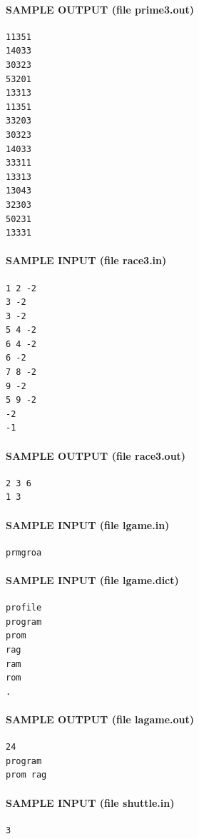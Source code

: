\documentclass[11pt]{article}
\begin{document}
\paragraph{SAMPLE OUTPUT (file prime3.out)}
\begin{verbatim}
11351
14033
30323
53201
13313
11351
33203
30323
14033
33311
13313
13043
32303
50231
13331
\end{verbatim}

\paragraph{SAMPLE INPUT (file race3.in)}
\begin{verbatim}
1 2 -2
3 -2
3 -2
5 4 -2
6 4 -2
6 -2
7 8 -2
9 -2
5 9 -2
-2
-1
\end{verbatim}

\paragraph{SAMPLE OUTPUT (file race3.out)}
\begin{verbatim}
2 3 6
1 3
\end{verbatim}

\paragraph{SAMPLE INPUT (file lgame.in)}
\begin{verbatim}
prmgroa
\end{verbatim}

\paragraph{SAMPLE INPUT (file lgame.dict)}
\begin{verbatim}
profile
program
prom
rag
ram
rom
.
\end{verbatim}

\paragraph{SAMPLE OUTPUT (file lagame.out)}
\begin{verbatim}
24
program
prom rag
\end{verbatim}

\paragraph{SAMPLE INPUT (file shuttle.in)}
\begin{verbatim}
3
\end{verbatim}
\end{document}
